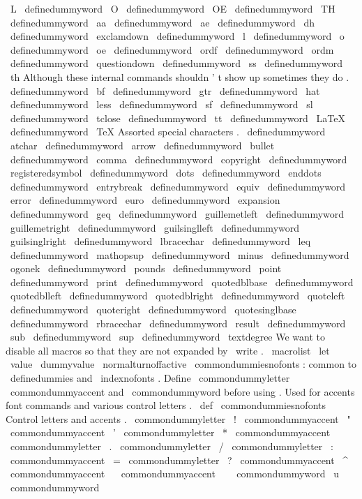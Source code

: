 {{{{{\
L
\
definedummyword
\
O
\
definedummyword
\
OE
\
definedummyword
\
TH
\
definedummyword
\
aa
\
definedummyword
\
ae
\
definedummyword
\
dh
\
definedummyword
\
exclamdown
\
definedummyword
\
l
\
definedummyword
\
o
\
definedummyword
\
oe
\
definedummyword
\
ordf
\
definedummyword
\
ordm
\
definedummyword
\
questiondown
\
definedummyword
\
ss
\
definedummyword
\
th
%
%
Although
these
internal
commands
shouldn
'
t
show
up
sometimes
they
do
.
\
definedummyword
\
bf
\
definedummyword
\
gtr
\
definedummyword
\
hat
\
definedummyword
\
less
\
definedummyword
\
sf
\
definedummyword
\
sl
\
definedummyword
\
tclose
\
definedummyword
\
tt
%
\
definedummyword
\
LaTeX
\
definedummyword
\
TeX
%
%
Assorted
special
characters
.
\
definedummyword
\
atchar
\
definedummyword
\
arrow
\
definedummyword
\
bullet
\
definedummyword
\
comma
\
definedummyword
\
copyright
\
definedummyword
\
registeredsymbol
\
definedummyword
\
dots
\
definedummyword
\
enddots
\
definedummyword
\
entrybreak
\
definedummyword
\
equiv
\
definedummyword
\
error
\
definedummyword
\
euro
\
definedummyword
\
expansion
\
definedummyword
\
geq
\
definedummyword
\
guillemetleft
\
definedummyword
\
guillemetright
\
definedummyword
\
guilsinglleft
\
definedummyword
\
guilsinglright
\
definedummyword
\
lbracechar
\
definedummyword
\
leq
\
definedummyword
\
mathopsup
\
definedummyword
\
minus
\
definedummyword
\
ogonek
\
definedummyword
\
pounds
\
definedummyword
\
point
\
definedummyword
\
print
\
definedummyword
\
quotedblbase
\
definedummyword
\
quotedblleft
\
definedummyword
\
quotedblright
\
definedummyword
\
quoteleft
\
definedummyword
\
quoteright
\
definedummyword
\
quotesinglbase
\
definedummyword
\
rbracechar
\
definedummyword
\
result
\
definedummyword
\
sub
\
definedummyword
\
sup
\
definedummyword
\
textdegree
%
%
We
want
to
disable
all
macros
so
that
they
are
not
expanded
by
\
write
.
\
macrolist
\
let
\
value
\
dummyvalue
%
\
normalturnoffactive
}
%
\
commondummiesnofonts
:
common
to
\
definedummies
and
\
indexnofonts
.
%
Define
\
commondummyletter
\
commondummyaccent
and
\
commondummyword
before
%
using
.
Used
for
accents
font
commands
and
various
control
letters
.
%
\
def
\
commondummiesnofonts
{
%
%
Control
letters
and
accents
.
\
commondummyletter
\
!
%
\
commondummyaccent
\
"
%
\
commondummyaccent
\
'
%
\
commondummyletter
\
*
%
\
commondummyaccent
\
%
\
commondummyletter
\
.
%
\
commondummyletter
\
/
%
\
commondummyletter
\
:
%
\
commondummyaccent
\
=
%
\
commondummyletter
\
?
%
\
commondummyaccent
\
^
%
\
commondummyaccent
\
%
\
commondummyaccent
\
~
%
\
commondummyword
\
u
\
commondummyword
}}}}}
